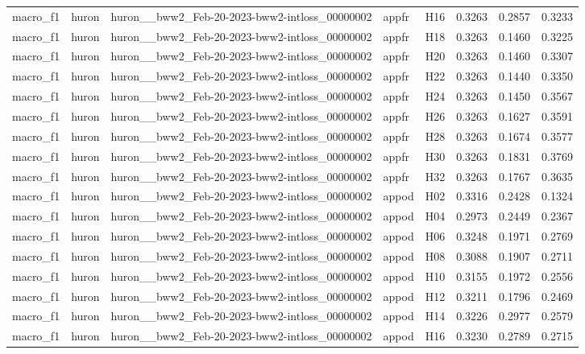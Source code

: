 \begin{table}[tbp]
\begin{tabular}{lllllrrr}
macro\_f1 & huron & huron\_\_bww2\_Feb-20-2023-bww2-intloss\_00000002 & appfr & H16 & 0.3263 & 0.2857 & 0.3233 \\
macro\_f1 & huron & huron\_\_bww2\_Feb-20-2023-bww2-intloss\_00000002 & appfr & H18 & 0.3263 & 0.1460 & 0.3225 \\
macro\_f1 & huron & huron\_\_bww2\_Feb-20-2023-bww2-intloss\_00000002 & appfr & H20 & 0.3263 & 0.1460 & 0.3307 \\
macro\_f1 & huron & huron\_\_bww2\_Feb-20-2023-bww2-intloss\_00000002 & appfr & H22 & 0.3263 & 0.1440 & 0.3350 \\
macro\_f1 & huron & huron\_\_bww2\_Feb-20-2023-bww2-intloss\_00000002 & appfr & H24 & 0.3263 & 0.1450 & 0.3567 \\
macro\_f1 & huron & huron\_\_bww2\_Feb-20-2023-bww2-intloss\_00000002 & appfr & H26 & 0.3263 & 0.1627 & 0.3591 \\
macro\_f1 & huron & huron\_\_bww2\_Feb-20-2023-bww2-intloss\_00000002 & appfr & H28 & 0.3263 & 0.1674 & 0.3577 \\
macro\_f1 & huron & huron\_\_bww2\_Feb-20-2023-bww2-intloss\_00000002 & appfr & H30 & 0.3263 & 0.1831 & 0.3769 \\
macro\_f1 & huron & huron\_\_bww2\_Feb-20-2023-bww2-intloss\_00000002 & appfr & H32 & 0.3263 & 0.1767 & 0.3635 \\
macro\_f1 & huron & huron\_\_bww2\_Feb-20-2023-bww2-intloss\_00000002 & appod & H02 & 0.3316 & 0.2428 & 0.1324 \\
macro\_f1 & huron & huron\_\_bww2\_Feb-20-2023-bww2-intloss\_00000002 & appod & H04 & 0.2973 & 0.2449 & 0.2367 \\
macro\_f1 & huron & huron\_\_bww2\_Feb-20-2023-bww2-intloss\_00000002 & appod & H06 & 0.3248 & 0.1971 & 0.2769 \\
macro\_f1 & huron & huron\_\_bww2\_Feb-20-2023-bww2-intloss\_00000002 & appod & H08 & 0.3088 & 0.1907 & 0.2711 \\
macro\_f1 & huron & huron\_\_bww2\_Feb-20-2023-bww2-intloss\_00000002 & appod & H10 & 0.3155 & 0.1972 & 0.2556 \\
macro\_f1 & huron & huron\_\_bww2\_Feb-20-2023-bww2-intloss\_00000002 & appod & H12 & 0.3211 & 0.1796 & 0.2469 \\
macro\_f1 & huron & huron\_\_bww2\_Feb-20-2023-bww2-intloss\_00000002 & appod & H14 & 0.3226 & 0.2977 & 0.2579 \\
macro\_f1 & huron & huron\_\_bww2\_Feb-20-2023-bww2-intloss\_00000002 & appod & H16 & 0.3230 & 0.2789 & 0.2715 \\

\end{tabular}
\end{table}

